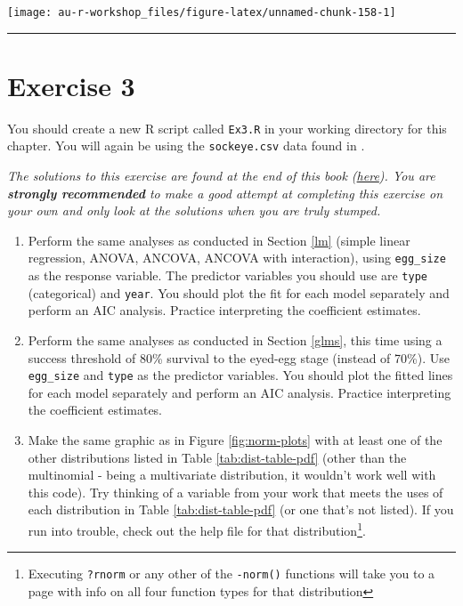 \documentclass[]{book}
\providecommand{\tightlist}{%
  \setlength{\itemsep}{0pt}\setlength{\parskip}{0pt}}
\let\rmarkdownfootnote\footnote%
\def\footnote{\protect\rmarkdownfootnote}
\begin{document}
\begin{center}\texttt{[image: au-r-workshop\_files/figure-latex/unnamed-chunk-158-1]} \end{center}

\begin{center}\rule{0.5\linewidth}{\linethickness}\end{center}

\hypertarget{exercise-3}{%
\section*{Exercise 3}\label{exercise-3}}

You should create a new R script called \texttt{Ex3.R} in your working directory for this chapter. You will again be using the \texttt{sockeye.csv} data found in \citet{sockeye-cite}.

\emph{The solutions to this exercise are found at the end of this book (\protect\hyperlink{ex3-answers}{here}). You are \textbf{strongly recommended} to make a good attempt at completing this exercise on your own and only look at the solutions when you are truly stumped.}

\begin{enumerate}
\def\labelenumi{\arabic{enumi}.}
\tightlist
\item
  Perform the same analyses as conducted in Section \ref{lm} (simple linear regression, ANOVA, ANCOVA, ANCOVA with interaction), using \texttt{egg\_size} as the response variable. The predictor variables you should use are \texttt{type} (categorical) and \texttt{year}. You should plot the fit for each model separately and perform an AIC analysis. Practice interpreting the coefficient estimates.
\item
  Perform the same analyses as conducted in Section \ref{glms}, this time using a success threshold of 80\% survival to the eyed-egg stage (instead of 70\%). Use \texttt{egg\_size} and \texttt{type} as the predictor variables. You should plot the fitted lines for each model separately and perform an AIC analysis. Practice interpreting the coefficient estimates.
\item
  Make the same graphic as in Figure \ref{fig:norm-plots} with at least one of the other distributions listed in Table \ref{tab:dist-table-pdf} (other than the multinomial - being a multivariate distribution, it wouldn't work well with this code). Try thinking of a variable from your work that meets the uses of each distribution in Table \ref{tab:dist-table-pdf} (or one that's not listed). If you run into trouble, check out the help file for that distribution\footnote{Executing \texttt{?rnorm} or any other of the \texttt{-norm()} functions will take you to a page with info on all four function types for that distribution}.
\end{enumerate}
\end{document}
